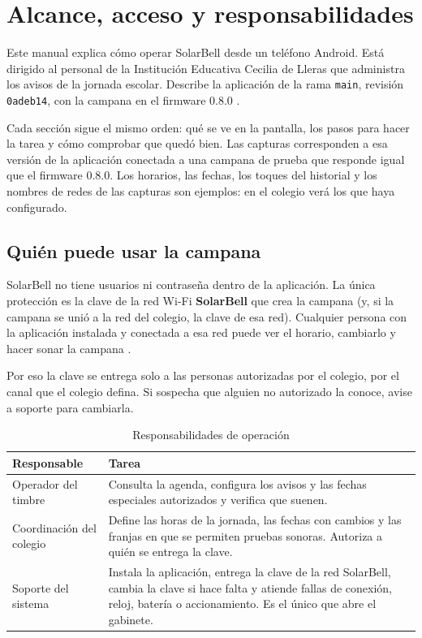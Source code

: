 \documentclass[a4paper,11pt]{article}
\newcommand{\pin}[1]{\texttt{#1}}
\begin{document}
\tableofcontents

\clearpage
\section{Alcance, acceso y responsabilidades}
\label{sec:alcance}
Este manual explica cómo operar SolarBell desde un teléfono Android. Está dirigido al personal de la Institución Educativa Cecilia de Lleras que administra los avisos de la jornada escolar. Describe la aplicación de la rama \pin{main}, revisión \pin{0adeb14}, con la campana en el firmware 0.8.0 \cite{repo,firmware,informe}.

Cada sección sigue el mismo orden: qué se ve en la pantalla, los pasos para hacer la tarea y cómo comprobar que quedó bien. Las capturas corresponden a esa versión de la aplicación conectada a una campana de prueba que responde igual que el firmware 0.8.0. Los horarios, las fechas, los toques del historial y los nombres de redes de las capturas son ejemplos: en el colegio verá los que haya configurado.

\subsection{Quién puede usar la campana}
SolarBell no tiene usuarios ni contraseña dentro de la aplicación. La única protección es la clave de la red Wi-Fi \textbf{SolarBell} que crea la campana (y, si la campana se unió a la red del colegio, la clave de esa red). Cualquier persona con la aplicación instalada y conectada a esa red puede ver el horario, cambiarlo y hacer sonar la campana \cite{firmware}.

Por eso la clave se entrega solo a las personas autorizadas por el colegio, por el canal que el colegio defina. Si sospecha que alguien no autorizado la conoce, avise a soporte para cambiarla.

\begin{table}[H]
\centering\small
\caption{Responsabilidades de operación}
\begin{tabularx}{\linewidth}{@{}P{4.3cm}Y@{}}
\toprule
\textbf{Responsable} & \textbf{Tarea} \\
\midrule
Operador del timbre & Consulta la agenda, configura los avisos y las fechas especiales autorizados y verifica que suenen. \\
Coordinación del colegio & Define las horas de la jornada, las fechas con cambios y las franjas en que se permiten pruebas sonoras. Autoriza a quién se entrega la clave. \\
Soporte del sistema & Instala la aplicación, entrega la clave de la red SolarBell, cambia la clave si hace falta y atiende fallas de conexión, reloj, batería o accionamiento. Es el único que abre el gabinete. \\
\bottomrule
\end{tabularx}
\end{table}
\end{document}
